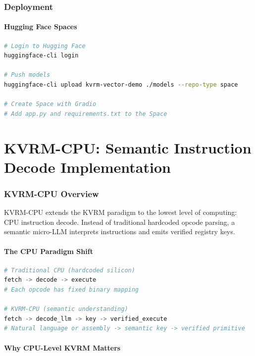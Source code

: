\documentclass[11pt,a4paper]{article}
\begin{document}
\section{Deployment}

\subsection{Hugging Face Spaces}

\begin{lstlisting}[language=bash, caption={Deploy to HF Spaces}]
# Login to Hugging Face
huggingface-cli login

# Push models
huggingface-cli upload kvrm-vector-demo ./models --repo-type space

# Create Space with Gradio
# Add app.py and requirements.txt to the Space
\end{lstlisting}

\part{KVRM-CPU: Semantic Instruction Decode Implementation}

\section{KVRM-CPU Overview}

KVRM-CPU extends the KVRM paradigm to the lowest level of computing: CPU instruction decode. Instead of traditional hardcoded opcode parsing, a semantic micro-LLM interprets instructions and emits verified registry keys.

\subsection{The CPU Paradigm Shift}

\begin{lstlisting}[language=Python, caption={Traditional vs KVRM CPU Decode}]
# Traditional CPU (hardcoded silicon)
fetch -> decode -> execute
# Each opcode has fixed binary mapping

# KVRM-CPU (semantic understanding)
fetch -> decode_llm -> key -> verified_execute
# Natural language or assembly -> semantic key -> verified primitive
\end{lstlisting}

\subsection{Why CPU-Level KVRM Matters}
\end{document}

